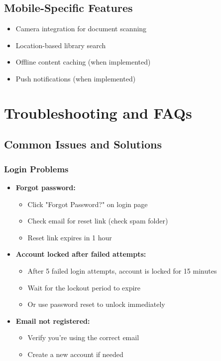 \documentclass[12pt,a4paper]{article}
\begin{document}
\subsection{Mobile-Specific Features}
\begin{itemize}[leftmargin=*]
    \item Camera integration for document scanning
    \item Location-based library search
    \item Offline content caching (when implemented)
    \item Push notifications (when implemented)
\end{itemize}

\newpage

\section{Troubleshooting and FAQs}

\subsection{Common Issues and Solutions}

\subsubsection{Login Problems}
\begin{itemize}[leftmargin=*]
    \item \textbf{Forgot password:}
        \begin{itemize}
            \item Click "Forgot Password?" on login page
            \item Check email for reset link (check spam folder)
            \item Reset link expires in 1 hour
        \end{itemize}
    \item \textbf{Account locked after failed attempts:}
        \begin{itemize}
            \item After 5 failed login attempts, account is locked for 15 minutes
            \item Wait for the lockout period to expire
            \item Or use password reset to unlock immediately
        \end{itemize}
    \item \textbf{Email not registered:}
        \begin{itemize}
            \item Verify you're using the correct email
            \item Create a new account if needed
        \end{itemize}
\end{itemize}
\end{document}
